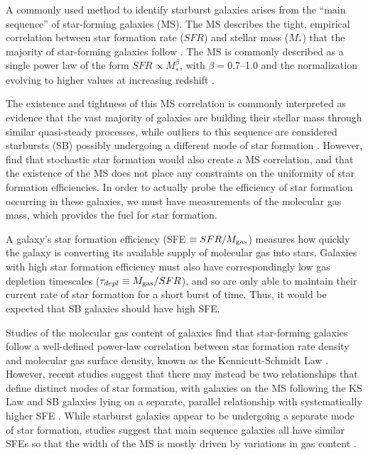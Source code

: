 \documentclass[a4paper,fleqn,usenatbib]{mnras}
\begin{document}
A commonly used method to identify starburst galaxies arises from the ``main sequence'' of star-forming galaxies (MS). The MS describes the tight, empirical correlation between star formation rate ($SFR$) and stellar mass ($M_{*}$) that the majority of star-forming galaxies follow \citep{2007ApJ...660L..43N,2007ApJ...670..156D,2007A&A...468...33E,2007ApJS..173..267S}.  The MS is commonly described as a single power law of the form $SFR \propto M_{*}^{\beta}$, with $\beta = 0.7$--1.0 and the normalization evolving to higher values at increasing redshift \citep{2007ApJ...660L..43N,2014ApJS..214...15S}.  

The existence and tightness of this MS correlation is commonly interpreted as evidence that the vast majority of galaxies are building their stellar mass through similar quasi-steady processes, while outliers to this sequence are considered starbursts (SB) possibly undergoing a different mode of star formation  \citep[e.g.][]{2011A&A...533A.119E,2011ApJ...739L..40R,2012ApJ...747L..31S,2014ApJ...796...25S}. However, \citet{2014arXiv1406.5191K} find that stochastic star formation would also create a MS correlation, and that the existence of the MS does not place any constraints on the uniformity of star formation efficiencies. In order to actually probe the efficiency of star formation occurring in these galaxies, we must have measurements of the molecular gas mass, which provides the fuel for star formation. 

A galaxy's star formation efficiency (SFE $\equiv SFR/M_{\rm{gas}}$) measures how quickly the galaxy is converting its available supply of molecular gas into stars.  Galaxies with high star formation efficiency must also have correspondingly low gas depletion timescales ($\tau_{depl} \equiv M_{\rm{gas}} / SFR$), and so are only able to maintain their current rate of star formation for a short burst of time.  Thus, it would be expected that SB galaxies should have high SFE. 

Studies of the molecular gas content of galaxies find that star-forming galaxies follow a well-defined power-law correlation between star formation rate density and molecular gas surface density, known as the Kennicutt-Schmidt Law \citep[see review in][]{2012ARA&A..50..531K}.  However, recent studies suggest that there may instead be two relationships that define distinct modes of star formation, with galaxies on the MS following the KS Law and SB galaxies lying on a separate, parallel relationship with systematically higher SFE \citep{2007ApJ...671..303B,2010ApJ...714L.118D,2010MNRAS.407.2091G,2015ApJ...812L..23S}.  While starburst galaxies appear to be undergoing a separate mode of star formation, studies suggest that main sequence galaxies all have similar SFEs so that the width of the MS is mostly driven by variations in gas content \citep[e.g.][]{2012ApJ...760....6M,2010ApJ...714L.118D,2010MNRAS.407.2091G}. 
\end{document}
